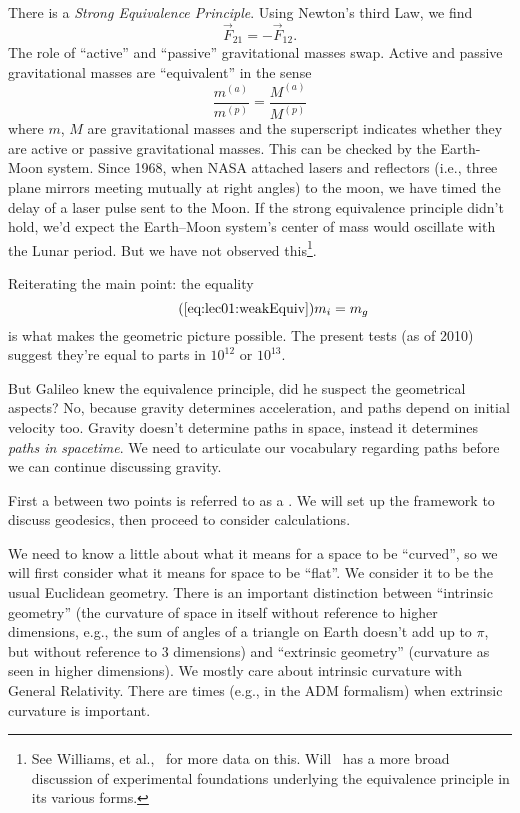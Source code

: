 There is a \emph{Strong Equivalence Principle}. Using
Newton's third Law, we find
\begin{equation}
\vec{F}_{21}=-\vec{F}_{12}.
\end{equation}
The role of ``active'' and ``passive'' gravitational masses swap.
Active and passive gravitational masses are ``equivalent'' in the sense
\begin{equation}
\frac{m^{(a)}}{m^{(p)}}=\frac{M^{(a)}}{M^{(p)}}
\end{equation}
where $m$, $M$ are gravitational masses and the superscript
indicates whether they are active or passive gravitational
masses. This can be checked by the Earth-Moon system.
Since 1968, when NASA attached lasers and reflectors (i.e., three plane mirrors
meeting mutually at right angles) to the moon, we have timed the
delay of a laser pulse sent to the Moon. If the strong
equivalence principle didn't hold, we'd expect the
Earth--Moon system's center of mass would oscillate with the
Lunar period. But we have not observed this\footnote{See Williams, et al.,~\cite{Williams:2005rv} for more data on this. Will~\cite{Will:1998dx} has a more broad discussion of experimental foundations underlying the equivalence principle in its various forms.}.

Reiterating the main point: the equality
\begin{equation*}\tag{\ref*{eq:lec01:weakEquiv}}
m_{i}=m_{g}
\end{equation*}
is what makes the geometric picture possible. The present tests
(as of 2010) suggest they're equal to parts in $10^{12}$ or $10^{13}$.

But Galileo knew the equivalence principle, did he suspect the
geometrical aspects? No, because gravity determines acceleration,
and paths depend on initial velocity too. Gravity doesn't
determine paths in space, instead it determines \emph{paths in spacetime}.
We need to articulate our vocabulary regarding paths before we can
continue discussing gravity.

First a  between two points is referred to
as a . We will set up the framework to discuss
geodesics, then proceed to consider calculations.

We need to know a little about what it means for a space to be
``curved'', so we will first consider what it means for space to
be ``flat''. We consider it to be the usual Euclidean
geometry. There is an important distinction between ``intrinsic geometry''
(the curvature of space in itself without reference to higher
dimensions, e.g., the sum of angles of a triangle on Earth
doesn't add up to $\pi$, but without reference to 3 dimensions)
and ``extrinsic geometry'' 
(curvature as seen in higher dimensions). We mostly care about
intrinsic curvature with General Relativity. There are times
(e.g., in the ADM formalism) when extrinsic curvature is
important. 

